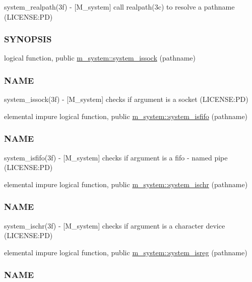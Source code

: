 \begin{DoxyCompactItemize}
\begin{DoxyCompactList}
system\+\_\+realpath(3f) -\/ \mbox{[}M\+\_\+system\mbox{]} call realpath(3c) to resolve a pathname (L\+I\+C\+E\+N\+SE\+:PD) \subsubsection*{S\+Y\+N\+O\+P\+S\+IS}\end{DoxyCompactList}\item 
logical function, public \mbox{\hyperlink{namespacem__system_af6eb5074fe74552bc7a5e7d00f459087}{m\+\_\+system\+::system\+\_\+issock}} (pathname)
\begin{DoxyCompactList}\small\item\em \subsubsection*{N\+A\+ME}

system\+\_\+issock(3f) -\/ \mbox{[}M\+\_\+system\mbox{]} checks if argument is a socket (L\+I\+C\+E\+N\+SE\+:PD) \end{DoxyCompactList}\item 
elemental impure logical function, public \mbox{\hyperlink{namespacem__system_aa2bdb5f75405d87934c10756b539d082}{m\+\_\+system\+::system\+\_\+isfifo}} (pathname)
\begin{DoxyCompactList}\small\item\em \subsubsection*{N\+A\+ME}

system\+\_\+isfifo(3f) -\/ \mbox{[}M\+\_\+system\mbox{]} checks if argument is a fifo -\/ named pipe (L\+I\+C\+E\+N\+SE\+:PD) \end{DoxyCompactList}\item 
elemental impure logical function, public \mbox{\hyperlink{namespacem__system_a49f1d027d438aab86024660b0802768f}{m\+\_\+system\+::system\+\_\+ischr}} (pathname)
\begin{DoxyCompactList}\small\item\em \subsubsection*{N\+A\+ME}

system\+\_\+ischr(3f) -\/ \mbox{[}M\+\_\+system\mbox{]} checks if argument is a character device (L\+I\+C\+E\+N\+SE\+:PD) \end{DoxyCompactList}\item 
elemental impure logical function, public \mbox{\hyperlink{namespacem__system_a8ea0d0430227af61b8083b4e7d6e597d}{m\+\_\+system\+::system\+\_\+isreg}} (pathname)
\begin{DoxyCompactList}\small\item\em \subsubsection*{N\+A\+ME}


\end{DoxyCompactList}
\end{DoxyCompactItemize}
